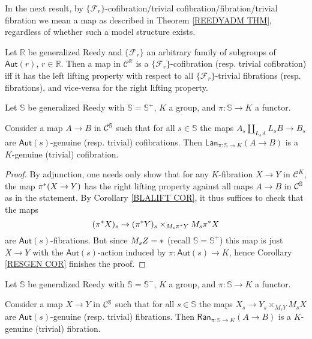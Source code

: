 \documentclass[a4paper,10pt
 ,draft
]{article}%
\begin{document}
In the next result, by $\{\mathcal{F}_r\}$-cofibration/trivial cofibration/fibration/trivial fibration 
we mean a map as described in 
Theorem \ref{REEDYADM THM}, regardless of whether such a model structure exists.

\begin{corollary}\label{BLALIFT COR}
Let $\mathbb{R}$ be generalized Reedy and 
$\{\mathcal{F}_r\}$ an arbitrary family of subgroups of $\mathsf{Aut}(r)$, $r \in \mathbb{R}$.
Then a map in $\mathcal{C}^{\mathbb{R}}$ 
is a $\{\mathcal{F}_r\}$-cofibration (resp. trivial cofibration) iff it has the left lifting property 
with respect to all 
$\{\mathcal{F}_r\}$-trivial fibrations (resp. fibrations),
and vice-versa for the right lifting property.
\end{corollary}

\begin{lemma}\label{GINJ LEM}
Let $\mathbb{S}$ be generalized Reedy with $\mathbb{S}=\mathbb{S}^+$, $K$ a group, and $\pi \colon \mathbb{S} \to K$ a functor.

Consider a map $A \to B$ in $\mathcal{C}^{\mathbb{S}}$ such that for all 
$s \in \mathbb{S}$
the maps 
$
  A_s \amalg_{L_s A} L_s B \to B_s
$	
are $\mathsf{Aut}(s)$-genuine (resp. trivial) cofibrations. 
Then $\mathsf{Lan}_{\pi\colon \mathbb{S} \to K}(A \to B)$
is a $K$-genuine (trivial) cofibration.
\end{lemma}


\begin{proof}
By adjunction, one needs only show that for any 
$K$-fibration $X \to Y$ in $\mathcal{C}^K$,
the map $\pi^{\**}(X \to Y)$
has the right lifting property against all maps $A \to B$ in $\mathcal{C}^{\mathbb{S}}$ as in the statement.
By Corollary \ref{BLALIFT COR}, it thus suffices to check
that the maps
\[
	(\pi^{\**} X)_s \to 
	(\pi^{\**} Y)_s \times_{M_s \pi^{\**} Y} M_s \pi^{\**} X
\]
are $\mathsf{Aut}(s)$-fibrations. But since $M_s Z = \**$ 
(recall $\mathbb{S}=\mathbb{S}^+$)
this map is just $X \to Y$ with the $\mathsf{Aut}(s)$-action induced by
$\pi \colon \mathsf{Aut}(s) \to K$, hence 
Corollary \ref{RESGEN COR} finishes the proof.
\end{proof}


\begin{lemma}\label{GINJMIN LEM}
Let $\mathbb{S}$ be generalized Reedy with $\mathbb{S}=\mathbb{S}^-$, $K$ a group, and $\pi \colon \mathbb{S} \to K$ a functor.

Consider a map $X \to Y$ in $\mathcal{C}^{\mathbb{S}}$ such that for all 
$s \in \mathbb{S}$
the maps 
$
	X_s \to Y_s \times_{M_s Y} M_s X
$	
are $\mathsf{Aut}(s)$-genuine (resp. trivial) fibrations.
Then 
$\mathsf{Ran}_{\pi\colon \mathbb{S} \to K}(A \to B)$
is a $K$-genuine (trivial) fibration.
\end{lemma}
\end{document}
